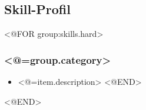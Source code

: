 \documentclass[11pt, a4paper]{article}
\begin{document}
\subsection*{Skill-Profil}
<@FOR group:skills.hard>
\subsubsection*{<@=group.category>}
\begin{itemize}
<@FOR item:group.content>
\item <@=item.description>
<@END>
\end{itemize}
<@END> 

\label{LastPage}
\end{document}
